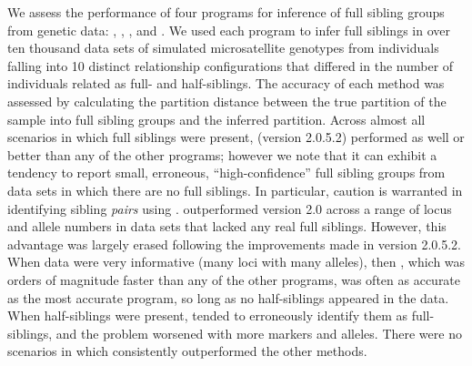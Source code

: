 

We assess the performance of four programs for inference of full sibling groups from
genetic data: \colony{} \citep{wang04,Wang2012pairwise}, \prt{} 
\citep{almudevar99}, \familyfinder{} \citep{beyer03}, and \kinalyzer{} 
\citep{bergerwolf07, sheik08}. We used each program to infer full siblings
in over ten thousand data sets of simulated microsatellite  
genotypes from individuals falling into 10 distinct relationship configurations
that differed in the number of individuals related as full- and half-siblings. 
The accuracy of
each method was assessed by calculating the partition distance between the true partition
of the sample into full sibling groups and the inferred partition. Across almost all
scenarios in which full siblings were present, \colony{} (version 2.0.5.2) performed as well or better than
any of the other programs; however we note that it can exhibit a tendency to report 
small, erroneous, ``high-confidence'' full sibling groups from data sets in which there
are no full siblings. In particular, caution is warranted in identifying sibling
{\em pairs} using \colony{}.  \prt{} outperformed \colony{} version 2.0 across a range of 
locus and allele numbers in data sets that lacked any real full siblings.  However, this advantage
was largely erased following the improvements made in \colony{} version 2.0.5.2. 
When data were very informative (many loci with many alleles), then
\familyfinder{}, which was orders of magnitude faster than any of the other programs,
was often as accurate as the most accurate program, so long as no
half-siblings appeared in the data.  When half-siblings
were present, \familyfinder{} tended to erroneously identify
them as full-siblings, and the problem worsened with more markers and alleles.
There were no scenarios in which \kinalyzer{} consistently outperformed the other methods.

